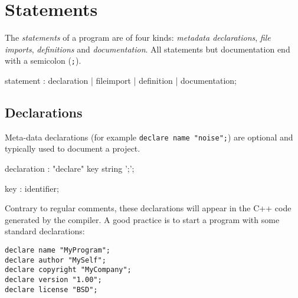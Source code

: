 \section{Statements}

The \textit{statements} of a \faust program are of four kinds: \textit{metadata declarations}, \textit{file imports},  \textit{definitions} and \textit{documentation}. All statements but documentation end with a semicolon (\lstinline';'). 
% 

\begin{rail}
statement : declaration | fileimport | definition | documentation;
\end{rail}

\subsection{Declarations}

Meta-data declarations (for example \lstinline'declare name "noise";') are optional and typically used to document a \faust project. 

% 

\begin{rail}
declaration : "declare" key string ';';
\end{rail}

\begin{rail}
key : identifier;
\end{rail}

Contrary to regular comments, these declarations will appear in the C++ code generated by the compiler. A good practice is to start a \faust program with some standard declarations:
\begin{lstlisting}
declare name "MyProgram";
declare author "MySelf";
declare copyright "MyCompany";
declare version "1.00";
declare license "BSD"; 
\end{lstlisting}

